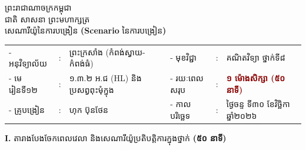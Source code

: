 \documentclass[a4paper,10pt]{article}
\newcommand{\enbf}[1]{{\TimesEn\textbf{#1}}}
\begin{document}
\fontsize{10pt}{14.8pt}\selectfont

\begin{center}
  {\muol\fontsize{11pt}{16pt}\selectfont ព្រះរាជាណាចក្រកម្ពុជា}\\[1pt]
  {\muol\fontsize{10pt}{15pt}\selectfont ជាតិ សាសនា ព្រះមហាក្សត្រ}\\[4pt]
  {\muol\fontsize{10.5pt}{15pt}\selectfont សេណារីយ៉ូនៃការបង្រៀន \enbf{(Scenario} នៃការបង្រៀន\enbf{)}}
\end{center}

\vspace{2pt}
{\renewcommand{\arraystretch}{1.06}
\begin{tabular}{@{}l l l p{0.5cm} l l l@{}}
  - អនុវិទ្យាល័យ & : & ព្រះក្រសាំង (កំពង់ស្វាយ-កំពង់ធំ) & & - មុខវិជ្ជា & : & គណិតវិទ្យា ថ្នាក់ទី៨ \\
  - មេរៀនទី១២ & : & ១.៣.២ អ.ជ (HL) និងប្រសព្វពុះមុំក្នុង & & - រយៈពេលសរុប & : & \textcolor{darkred}{\textbf{១ ម៉ោងសិក្សា (៥០ នាទី)}} \\
  - គ្រូបង្រៀន & : & ហុក ប៊ុនថែន & & - កាលបរិច្ឆេទ & : & ថ្ងៃចន្ទ ទី៣០ ខែវិច្ឆិកា ឆ្នាំ២០២៦ \\
\end{tabular}
}

\vspace{3pt}

\textbf{I.} {\muol តារាងបែងចែកពេលវេលា និងសេណារីយ៉ូប្រតិបត្តិការក្នុងថ្នាក់} \textbf{(៥០ នាទី)}
\end{document}
